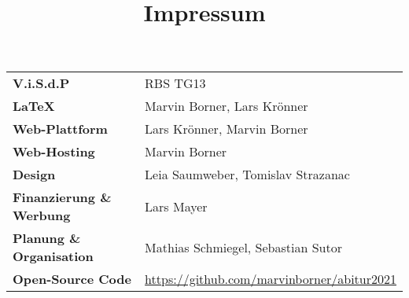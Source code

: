 \title{Impressum}


\begin{tabular}{ l l }
	\textbf{V.i.S.d.P}               & RBS TG13                                         \\ %
	\textbf{\LaTeX}                  & Marvin Borner, Lars Krönner                      \\
	\textbf{Web-Plattform}           & Lars Krönner, Marvin Borner                      \\
	\textbf{Web-Hosting}             & Marvin Borner                                    \\
	\textbf{Design}                  & Leia Saumweber, Tomislav Strazanac               \\
	\textbf{Finanzierung \& Werbung} & Lars Mayer                                       \\
	\textbf{Planung \& Organisation} & Mathias Schmiegel, Sebastian Sutor               \\
	\textbf{Open-Source Code}        & \url{https://github.com/marvinborner/abitur2021}
\end{tabular}
